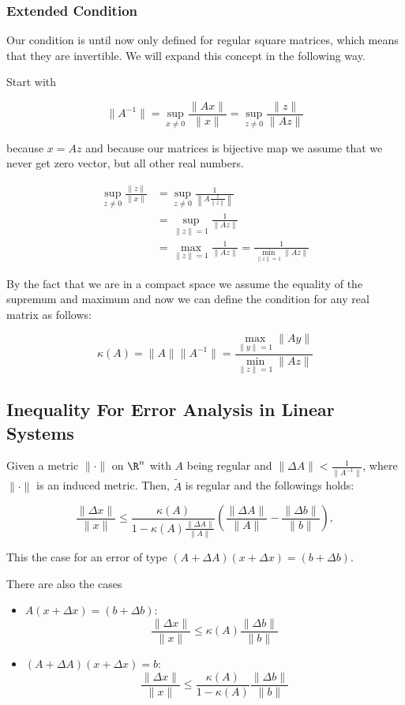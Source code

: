 \subsubsection{Extended Condition}

Our condition is until now only defined for regular square matrices, which means that they are invertible.
We will expand this concept in the following way.

Start with  

\[
    \|A^{-1}\| = \sup_{x \ne 0} \frac{\|Ax\|}{\|x\|} = \sup_{z \ne 0} \frac{\|z\|}{\|Az\|}
\]

because \(x = Az\) and because our matrices is bijective map we assume that we never get zero vector, but all other real numbers.

\begin{align*} 
    \sup_{z \ne 0} \frac{\|z\|}{\|x\|} &= \sup_{z \ne 0} \frac{1}{\left\|A \frac{z}{\|z\|}\right\|} \\ 
                                       &= \sup_{\|z\| = 1} \frac{1}{\|Az\|} \\ 
                                       &= \max_{\|z\| = 1} \frac{1}{\|Az\|} = \frac{1}{\min_{\|z\| = 1} \|Az\|}
\end{align*}

By the fact that we are in a compact space we assume the equality of the supremum and maximum and now we can define the 
condition for any real matrix as follows: 

\[
    \kappa(A) = \|A\|\|A^{-1}\| = \frac{\max_{\|y\| = 1} \|Ay\|}{\min_{\|z\| = 1}\|Az\|}
\]

\subsection{Inequality For Error Analysis in Linear Systems}

Given a metric \(\|\cdot \|\) on \(\R^n\) with \(A\) being regular and \(\|\Delta A\| < \frac{1}{\|A^{-1}\|}\), where \(\|\cdot\|\) is an induced metric. 
Then, \(\tilde{A}\) is regular and the followings holds: 

\[
    \frac{\|\Delta x\|}{\|x\|} \le \frac{\kappa(A)}{1 - \kappa(A) \frac{\|\Delta A\|}{\|A\|}} \left(\frac{\|\Delta A\|}{\|A\|} - \frac{\|\Delta b\|}{\|b\|}\right),
\]

This the case for an error of type \((A + \Delta A)(x + \Delta x) = (b + \Delta b)\). 

There are also the cases 

\begin{itemize}

    \item \(A(x + \Delta x) = (b + \Delta b)\): 
    \[
        \frac{\|\Delta x \|}{\|x\|} \le \kappa(A) \frac{\|\Delta b \| }{\|b\|}
    \]

    \item \((A + \Delta A)(x + \Delta x) = b\): 
    \[
        \frac{\|\Delta x \|}{\|x\|} \le \frac{\kappa(A)}{1 - \kappa(A)} \frac{\|\Delta b \| }{\|b\|}
    \]

\end{itemize}

